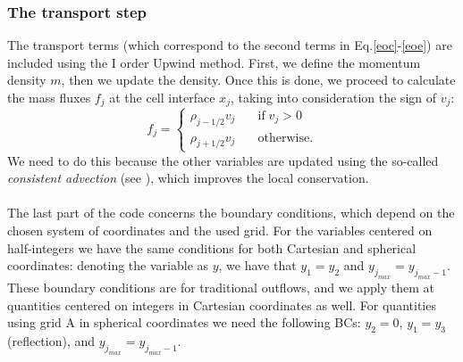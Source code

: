 \documentclass{article}
\begin{document}
\subsubsection{The transport step}
The transport terms (which correspond to the second terms in Eq.\eqref{eoc}-\eqref{eoe}) are included using the I order Upwind method. First, we define the momentum density $m$, then we update the density. Once this is done, we proceed to calculate the mass fluxes $f_j$ at the cell interface $x_j$, taking into consideration the sign of $v_j$:
\begin{equation}
	f_j=
	\begin{cases}
		\rho_{j-1/2}v_j \quad &\text{if} \; v_j>0\\
		\rho_{j+1/2}v_j \quad &\text{otherwise}.
	\end{cases}
\end{equation}
We need to do this because the other variables are updated using the so-called \textit{consistent advection} (see \cite[Sec. 4.4]{stone}), which improves the local conservation. \\
\paragraph{}
	The last part of the code concerns the boundary conditions, which depend on the chosen system of coordinates and the used grid. For the variables centered on half-integers we have the same conditions for both Cartesian and spherical coordinates: denoting the variable as $y$, we have that $y_1=y_2$ and $y_{j_{max}}=y_{j_{max}-1}$. These boundary conditions are for traditional outflows, and we apply them at quantities centered on integers in Cartesian coordinates as well. For quantities using grid A in spherical coordinates we need the following BCs: $y_2=0$, $y_1=y_3$ (reflection), and $y_{j_{max}}=y_{j_{max}-1}$.
\end{document}
